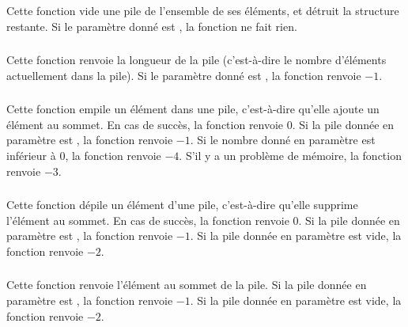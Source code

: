 \subsubsection*{}

\noindent Cette fonction vide une pile de l'ensemble de ses éléments, et détruit la structure restante.
Si le paramètre donné est , la fonction ne fait rien.


\subsubsection*{}

\noindent Cette fonction renvoie la longueur de la pile (c'est-à-dire le nombre d'éléments actuellement dans la pile).
Si le paramètre donné est , la fonction renvoie $ -1 $.


\subsubsection*{}

\noindent Cette fonction empile un élément dans une pile, c'est-à-dire qu'elle ajoute un élément au sommet.
En cas de succès, la fonction renvoie $ 0 $.
Si la pile donnée en paramètre est , la fonction renvoie $ -1 $.
Si le nombre donné en paramètre est inférieur à $ 0 $, la fonction renvoie $ -4 $.
S'il y a un problème de mémoire, la fonction renvoie $ -3 $.


\subsubsection*{}

\noindent Cette fonction dépile un élément d'une pile, c'est-à-dire qu'elle supprime l'élément au sommet.
En cas de succès, la fonction renvoie $ 0 $.
Si la pile donnée en paramètre est , la fonction renvoie $ -1 $.
Si la pile donnée en paramètre est vide, la fonction renvoie $ -2 $.


\subsubsection*{}

\noindent Cette fonction renvoie l'élément au sommet de la pile.
Si la pile donnée en paramètre est , la fonction renvoie $ -1 $.
Si la pile donnée en paramètre est vide, la fonction renvoie $ -2 $.


